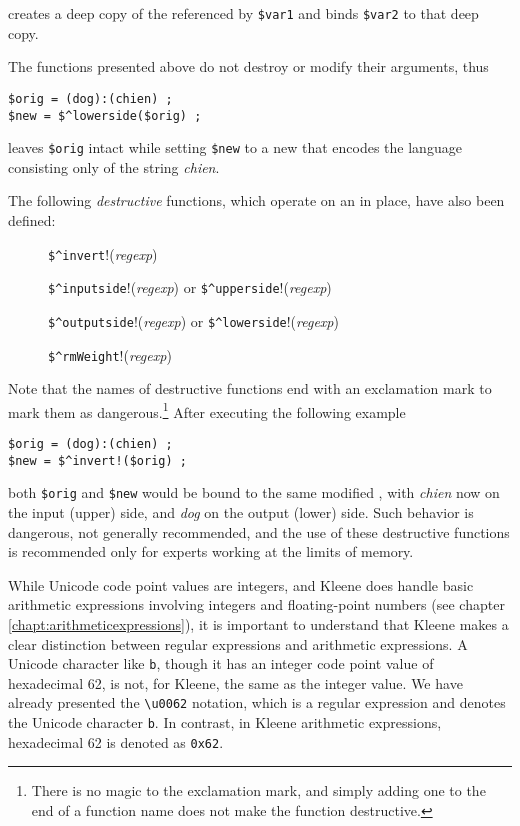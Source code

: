 \noindent
creates a deep copy of the \fsm{} referenced by \verb!$var1! and binds
\verb!$var2! to that deep copy.

The functions presented above do not destroy or modify their arguments, thus

\begin{Verbatim}
$orig = (dog):(chien) ;
$new = $^lowerside($orig) ;
\end{Verbatim}

\noindent
leaves \verb!$orig! intact while setting \verb!$new! to a new \fsm{}
that encodes the language consisting only of the string
\emph{chien}.  

The following \emph{destructive} functions, which operate on
an \fsm{} in place, have also been defined:

\begin{description}
\item[]
\verb!$^invert!!(\emph{regexp})
\item[]
\verb!$^inputside!!(\emph{regexp}) or \verb!$^upperside!!(\emph{regexp}) 
\item[]
\verb!$^outputside!!(\emph{regexp}) or \verb!$^lowerside!!(\emph{regexp}) 
\item[]
\verb!$^rmWeight!!(\emph{regexp})
\end{description}

\noindent
Note that the names of destructive functions end with an
exclamation mark to mark them as dangerous.\footnote{There is no magic 
to the exclamation mark,
and simply adding one to the end of a function name does not make the function
destructive.}  After executing the following example

\begin{Verbatim}
$orig = (dog):(chien) ;
$new = $^invert!($orig) ;
\end{Verbatim}

\noindent
both \verb!$orig! and \verb!$new! would be bound to the same
modified \fsm{}, with \emph{chien} now on the input (upper) side, and \emph{dog} on
the output (lower) side.  Such behavior is dangerous, not generally recommended, and the use of these
destructive functions is recommended only for experts working at the limits
of memory.

While Unicode code point values are integers, and Kleene does handle basic
arithmetic expressions involving integers and floating-point numbers (see chapter
\ref{chapt:arithmeticexpressions}), it is important to understand
that Kleene makes a clear distinction between regular expressions and arithmetic expressions.
A Unicode character like \texttt{b}, though it has an integer code point value of hexadecimal 62, is
not, for Kleene, the same as the integer value.  We have already presented the \verb!\u0062! notation,
which is a regular expression and denotes the Unicode character \texttt{b}.  In contrast, in Kleene arithmetic
expressions, hexadecimal 62 is denoted as \texttt{0x62}.  

